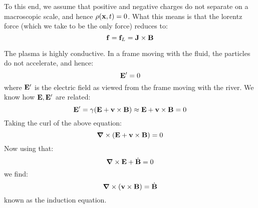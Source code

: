 To this end, we assume that positive and negative charges do not separate on a macroscopic scale, and hence $\rho(\mathbf{x}, t) = 0$. What this means is that the lorentz force (which we take to be the only force) reduces to:
\begin{equation}
    \mathbf{f} = \mathbf{f}_L = \mathbf{J} \times \mathbf{B}
\end{equation}

The plasma is highly conductive. In a frame moving with the fluid, the particles do not accelerate, and hence:
\begin{equation}
    \mathbf{E}' = 0
\end{equation}
where $\mathbf{E}'$ is the electric field as viewed from the frame moving with the river. We know how $\mathbf{E}, \mathbf{E}'$ are related:
\begin{equation}\label{eq:transformE}
    \mathbf{E}' = \gamma(\mathbf{E} + \mathbf{v}\times\mathbf{B}) \approx \mathbf{E} + \mathbf{v} \times \mathbf{B} = 0
\end{equation}
Taking the curl of the above equation:
\begin{equation}
    \nabla \times (\v{E} + \v{v} \times \v{B}) = 0
\end{equation}
Now using that:
\begin{equation}
    \nabla \times \v{E} + \dot{\v{B}} = 0
\end{equation}
we find:
\begin{equation}
    \nabla \times (\v{v} \times \v{B}) = \dot{\v{B}}
\end{equation}
known as the induction equation.

